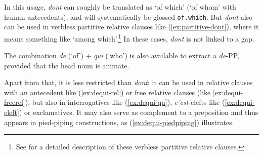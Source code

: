 In this usage, \emph{dont} can roughly be translated as `of which' (`of whom' with human antecedents), and will systematically be glossed \texttt{of.which}. But \emph{dont} also can be used in verbless partitive relative clauses like (\ref{ex:partitive-dont}), where it means something like `among which'.\footnote{See \citet{Bilbiie.2010} for a detailed description of these  verbless partitive relative clauses.} In these cases, \emph{dont} is not linked to a gap.

\label{ex:partitive-dont}
\z 

The combination \emph{de} (`of') + \emph{qui} (`who') is also available to extract a \emph{de}-PP, provided that the head noun is animate. 

\eal
{}
\label{ex:dequi-semantic-contraint}
\zl 

Apart from that, it is less restricted than \emph{dont}: it can be used in relative clauses with an antecedent like (\ref{ex:dequi-rel}) or free relative clauses (like \ref{ex:dequi-freerel}), but also in interrogatives like (\ref{ex:dequi-qu}), \emph{c'est}-clefts like (\ref{ex:dequi-cleft}) or exclamatives. It may also serve as complement to a preposition and thus appears in pied-piping constructions, as (\ref{ex:dequi-piedpiping}) illustrates. 


